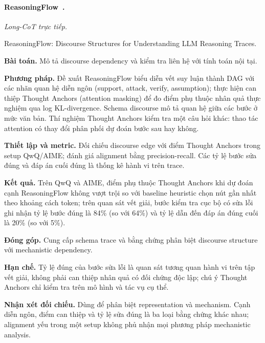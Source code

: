 \begin{samepage}
\paragraph{ReasoningFlow~\cite{rra3_reasoningflow}.}
\emph{Long-CoT trực tiếp.}\par
{\raggedright\noindent\small ReasoningFlow: Discourse Structures for Understanding LLM Reasoning Traces.\par}
\noindent\textbf{Bài toán.} Mô tả discourse dependency và kiểm tra liên hệ với tính toán nội tại.\par
\end{samepage}
\noindent\textbf{Phương pháp.} Đề xuất ReasoningFlow biểu diễn vết suy luận thành DAG với các nhãn quan hệ diễn ngôn (support, attack, verify, assumption); thực hiện can thiệp Thought Anchors (attention masking) để đo điểm phụ thuộc nhân quả thực nghiệm qua log KL-divergence. Schema discourse mô tả quan hệ giữa các bước ở mức văn bản. Thí nghiệm Thought Anchors kiểm tra một câu hỏi khác: thao tác attention có thay đổi phân phối dự đoán bước sau hay không.\par
\noindent\textbf{Thiết lập và metric.} Đối chiếu discourse edge với điểm Thought Anchors trong setup QwQ/AIME; đánh giá alignment bằng precision-recall. Các tỷ lệ bước sửa đúng và đáp án cuối đúng là thống kê hành vi trên trace.\par
\noindent\textbf{Kết quả.} Trên QwQ và AIME, điểm phụ thuộc Thought Anchors khi dự đoán cạnh ReasoningFlow không vượt trội so với baseline heuristic chọn nút gần nhất theo khoảng cách token; trên quan sát vết giải, bước kiểm tra cục bộ có sửa lỗi ghi nhận tỷ lệ bước đúng là 84\% (so với 64\%) và tỷ lệ dẫn đến đáp án đúng cuối là 20\% (so với 5\%).\par
\noindent\textbf{Đóng góp.} Cung cấp schema trace và bằng chứng phân biệt discourse structure với mechanistic dependency.\par
\noindent\textbf{Hạn chế.} Tỷ lệ đúng của bước sửa lỗi là quan sát tương quan hành vi trên tập vết giải, không phải can thiệp nhân quả có đối chứng độc lập; chú ý Thought Anchors chỉ kiểm tra trên mô hình và tác vụ cụ thể.\par
\begin{samepage}
\noindent\textbf{Nhận xét đối chiếu.} Dùng để phân biệt representation và mechanism. Cạnh diễn ngôn, điểm can thiệp và tỷ lệ sửa đúng là ba loại bằng chứng khác nhau; alignment yếu trong một setup không phủ nhận mọi phương pháp mechanistic analysis.\par
{}
\end{samepage}

